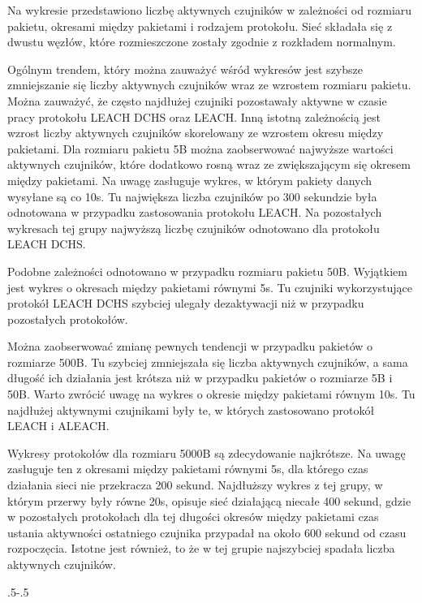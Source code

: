 
Na wykresie przedstawiono liczbę aktywnych czujników w zależności od rozmiaru pakietu, okresami między pakietami i rodzajem protokołu. Sieć składała się z dwustu węzłów, które rozmieszczone zostały zgodnie z rozkładem normalnym.

Ogólnym trendem, który można zauważyć wśród wykresów jest szybsze zmniejszanie się liczby aktywnych czujników wraz ze wzrostem rozmiaru pakietu. Można zauważyć, że często najdłużej czujniki pozostawały aktywne w czasie pracy protokołu LEACH DCHS oraz LEACH. Inną istotną zależnością jest wzrost liczby aktywnych czujników skorelowany ze wzrostem okresu między pakietami. 
Dla rozmiaru pakietu 5B można zaobserwować najwyższe wartości aktywnych czujników, które dodatkowo rosną wraz ze zwiększającym się okresem między pakietami. Na uwagę zasługuje wykres, w którym pakiety danych wysyłane są co 10s. Tu największa liczba czujników po 300 sekundzie była odnotowana w przypadku zastosowania protokołu LEACH. Na pozostałych wykresach tej grupy najwyższą liczbę czujników odnotowano dla protokołu LEACH DCHS.

Podobne zależności odnotowano w przypadku rozmiaru pakietu 50B. Wyjątkiem jest wykres o okresach między pakietami równymi 5s. Tu czujniki wykorzystujące protokół LEACH DCHS szybciej ulegały dezaktywacji niż w przypadku pozostałych protokołów. 

Można zaobserwować zmianę pewnych tendencji w przypadku pakietów o rozmiarze 500B. Tu szybciej zmniejszała się liczba aktywnych czujników, a sama długość ich działania jest krótsza niż w przypadku pakietów o rozmiarze 5B i 50B. Warto zwrócić uwagę na wykres o okresie między pakietami równym 10s. Tu najdłużej aktywnymi czujnikami były te, w których zastosowano protokół LEACH i ALEACH.
 
Wykresy protokołów dla rozmiaru 5000B są zdecydowanie najkrótsze. Na uwagę zasługuje ten z okresami między pakietami równymi 5s, dla którego czas działania sieci nie przekracza 200 sekund. Najdłuższy wykres z tej grupy, w którym przerwy były równe 20s, opisuje sieć działającą niecałe 400 sekund, gdzie w pozostałych protokołach dla tej długości okresów między pakietami czas ustania aktywności ostatniego czujnika przypadał na około 600 sekund od czasu rozpoczęcia. Istotne jest również, to że w tej grupie najszybciej spadała liczba aktywnych czujników. 

\clearpage
\thispagestyle{empty}

{\pdfpagewidth
    \vspace*{-2cm}
    \noindent\kern.5\pdfpagewidth{}\kern-.5\pdfpagewidth
     \par
     \vspace*{-5cm}
\clearpage
}

